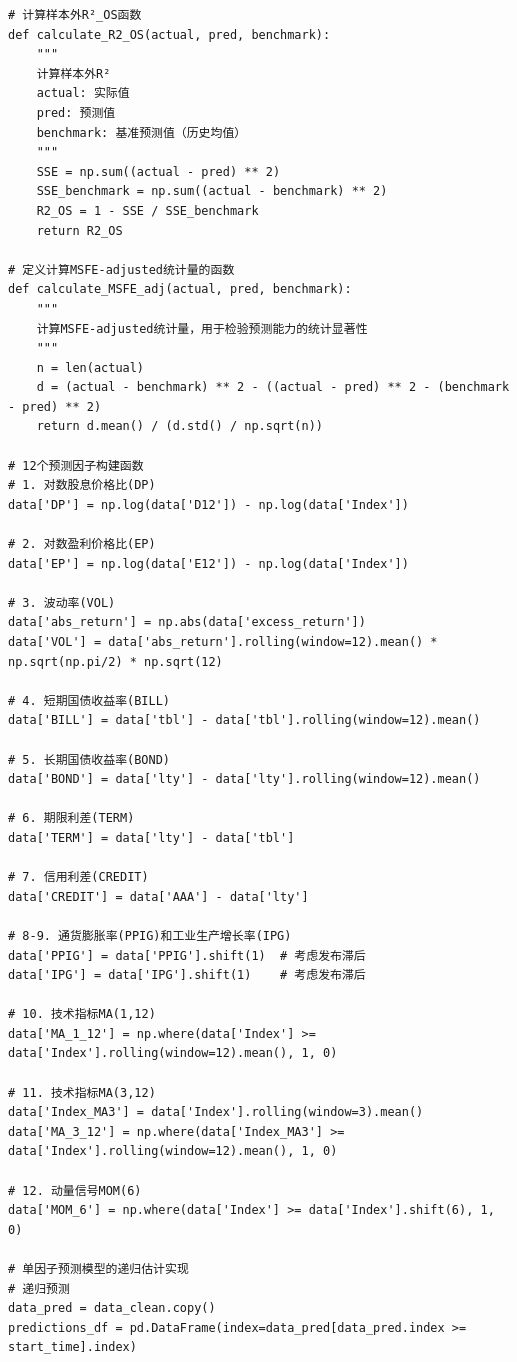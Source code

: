 \documentclass[12pt, a4paper]{article}
\begin{document}
\begin{lstlisting}[basicstyle=\small\ttfamily, breaklines=true, columns=fullflexible]
# 计算样本外R²_OS函数
def calculate_R2_OS(actual, pred, benchmark):
    """
    计算样本外R²
    actual: 实际值
    pred: 预测值
    benchmark: 基准预测值（历史均值）
    """
    SSE = np.sum((actual - pred) ** 2)
    SSE_benchmark = np.sum((actual - benchmark) ** 2)
    R2_OS = 1 - SSE / SSE_benchmark
    return R2_OS

# 定义计算MSFE-adjusted统计量的函数
def calculate_MSFE_adj(actual, pred, benchmark):
    """
    计算MSFE-adjusted统计量，用于检验预测能力的统计显著性
    """
    n = len(actual)
    d = (actual - benchmark) ** 2 - ((actual - pred) ** 2 - (benchmark - pred) ** 2)
    return d.mean() / (d.std() / np.sqrt(n))

# 12个预测因子构建函数
# 1. 对数股息价格比(DP)
data['DP'] = np.log(data['D12']) - np.log(data['Index'])

# 2. 对数盈利价格比(EP)
data['EP'] = np.log(data['E12']) - np.log(data['Index'])

# 3. 波动率(VOL)
data['abs_return'] = np.abs(data['excess_return'])
data['VOL'] = data['abs_return'].rolling(window=12).mean() * np.sqrt(np.pi/2) * np.sqrt(12)

# 4. 短期国债收益率(BILL)
data['BILL'] = data['tbl'] - data['tbl'].rolling(window=12).mean()

# 5. 长期国债收益率(BOND)
data['BOND'] = data['lty'] - data['lty'].rolling(window=12).mean()

# 6. 期限利差(TERM)
data['TERM'] = data['lty'] - data['tbl']

# 7. 信用利差(CREDIT)
data['CREDIT'] = data['AAA'] - data['lty']

# 8-9. 通货膨胀率(PPIG)和工业生产增长率(IPG)
data['PPIG'] = data['PPIG'].shift(1)  # 考虑发布滞后
data['IPG'] = data['IPG'].shift(1)    # 考虑发布滞后

# 10. 技术指标MA(1,12)
data['MA_1_12'] = np.where(data['Index'] >= data['Index'].rolling(window=12).mean(), 1, 0)

# 11. 技术指标MA(3,12)
data['Index_MA3'] = data['Index'].rolling(window=3).mean()
data['MA_3_12'] = np.where(data['Index_MA3'] >= data['Index'].rolling(window=12).mean(), 1, 0)

# 12. 动量信号MOM(6)
data['MOM_6'] = np.where(data['Index'] >= data['Index'].shift(6), 1, 0)

# 单因子预测模型的递归估计实现
# 递归预测
data_pred = data_clean.copy()
predictions_df = pd.DataFrame(index=data_pred[data_pred.index >= start_time].index)


\end{lstlisting}
\end{document}
